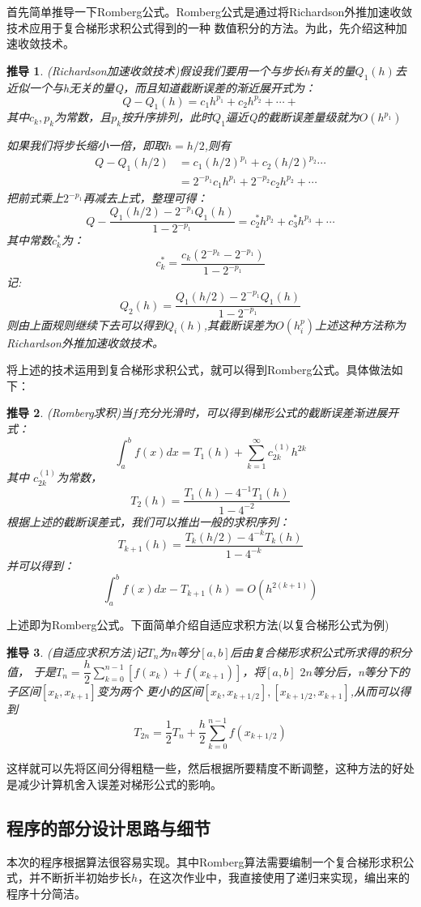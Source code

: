 \documentclass[10pt,a4paper]{ctexart}
\newtheorem{define}{\hspace{2em}推导}
\begin{document}
首先简单推导一下Romberg公式。Romberg公式是通过将Richardson外推加速收敛技术应用于复合梯形求积公式得到的一种
数值积分的方法。为此，先介绍这种加速收敛技术。
\begin{define}
(Richardson加速收敛技术)假设我们要用一个与步长h有关的量$Q_1(h)$去近似一个与h无关的量Q，而且知道截断误差的渐近展开式为：
\[Q-Q_1(h)=c_1h^{p_1}+c_2h^{p_2}+\cdots+\]
其中$c_k,p_k$为常数，且$p_k$按升序排列，此时$Q_1$逼近Q的截断误差量级就为$O(h^{p_1})$

如果我们将步长缩小一倍，即取$h=h/2$,则有
\begin{equation*}
\begin{split}
Q-Q_1(h/2) &=c_1(h/2)^{p_1}+c_2(h/2)^{p_2}\cdots \\
 &=2^{-p_1}c_1h^{p_1}+2^{-p_2}c_2h^{p_2}+\cdots
\end{split}
\end{equation*}
把前式乘上$2^{-p_1}$再减去上式，整理可得：
\[Q-\dfrac{Q_1(h/2)-2^{-p_1}Q_1(h)}{1-2^{-p_1}}=c_2^*h^{p_2}+c_3^{*}h^{p_3}+\cdots \]
其中常数$c_k^{*}$为：
\[c_k^{*}=\dfrac{c_k(2^{-p_k}-2^{-p_1})}{1-2^{-p_1}}\]
记:
\[Q_2(h)=\dfrac{Q_1(h/2)-2^{-p_1}Q_1(h)}{1-2^{-p_1}}\]
则由上面规则继续下去可以得到$Q_{i}(h)$,其截断误差为$O(h^p_i)$上述这种方法称为Richardson外推加速收敛技术。
\end{define}
将上述的技术运用到复合梯形求积公式，就可以得到Romberg公式。具体做法如下：
\begin{define}
(Romberg求积)当$f$充分光滑时，可以得到梯形公式的截断误差渐进展开式：
\[\int_{a}^{b}f(x)dx=T_1(h)+\sum_{k=1}^{\infty}c_{2k}^{(1)}h^{2k}\]
其中 $c_{2k}^{(1)}$为常数，
\[T_2(h)=\dfrac{T_1(h)-4^{-1}T_1(h)}{1-4^{-2}}\]
根据上述的截断误差式，我们可以推出一般的求积序列：
\[T_{k+1}(h)=\dfrac{T_k(h/2)-4^{-k}T_k(h)}{1-4^{-k}}\]
并可以得到：
\[\int_a^bf(x)dx-T_{k+1}(h)=O(h^{2(k+1)})\]
\end{define}
上述即为Romberg公式。下面简单介绍自适应求积方法(以复合梯形公式为例)
\begin{define}
(自适应求积方法)记$T_n$为n等分$[a,b]$后由复合梯形求积公式所求得的积分值，
于是$T_n=\dfrac{h}{2}\sum\limits_{k=0}^{n-1}[f(x_k)+f(x_{k+1})]$，将$[a,b]$ $2n$等分后，n等分下的子区间$[x_k,x_{k+1}]$变为两个
更小的区间$[x_k,x_{k+1/2}],[x_{k+1/2},x_{k+1}]$,从而可以得到
\[
T_{2n}=\dfrac{1}{2}T_n+\dfrac{h}{2}\sum_{k=0}^{n-1}f(x
_{k+1/2})
\]
\end{define}
这样就可以先将区间分得粗糙一些，然后根据所要精度不断调整，这种方法的好处是减少计算机舍入误差对梯形公式的影响。

\subsection{程序的部分设计思路与细节}
本次的程序根据算法很容易实现。其中Romberg算法需要编制一个复合梯形求积公式，并不断折半初始步长$h$，在这次作业中，我直接使用了递归来实现，编出来的程序十分简洁。
\end{document}
